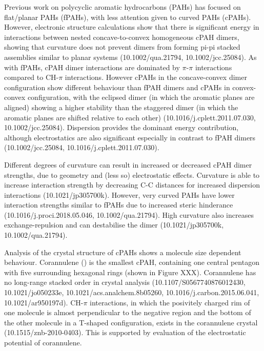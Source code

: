 Previous work on polycyclic aromatic hydrocarbons (PAHs) has focused on flat/planar PAHs (fPAHs), with less attention given to curved PAHs (cPAHs). However, electronic structure calculations show that there is significant energy in interactions between nested concave-to-convex homogeneous cPAH dimers, showing that curvature does not prevent dimers from forming pi-pi stacked assemblies similar to planar systems (10.1002/qua.21794, 10.1002/jcc.25084). As with fPAHs, cPAH dimer interactions are dominated by $\pi$-$\pi$ interactions compared to CH-$\pi$ interactions. However cPAHs in the concave-convex dimer configuration show different behaviour than fPAH dimers and cPAHs in convex-convex configuration, with the eclipsed dimer (in which the aromatic planes are aligned) showing a higher stability than the staggered dimer (in which the aromatic planes are shifted relative to each other) (10.1016/j.cplett.2011.07.030, 10.1002/jcc.25084).
Dispersion provides the dominant energy contribution, although electrostatics are also significant especially in contrast to fPAH dimers (10.1002/jcc.25084, 10.1016/j.cplett.2011.07.030). 

Different degrees of curvature can result in increased or decreased cPAH dimer strengths, due to geometry and (less so) electrostatic effects. Curvature is able to increase interaction strength by decreasing C-C distances for increased dispersion interactions (10.1021/jp305700k). 
However, very curved PAHs have lower interaction strengths similar to fPAHs due to increased steric hinderance (10.1016/j.proci.2018.05.046, 10.1002/qua.21794). High curvature also increases exchange-repulsion and can destabilise the dimer (10.1021/jp305700k, 10.1002/qua.21794).


Analysis of the crystal structure of cPAHs shows a molecule size dependent behaviour. Corannulene () is the smallest cPAH, containing one central pentagon with five surrounding hexagonal rings (shown in Figure XXX). Corannulene has no long-range stacked order in crystal analysis (10.1107/S0567740876012430, 10.1021/jo050233e, 10.1021/acs.analchem.8b05260, 10.1016/j.carbon.2015.06.041, 10.1021/ar950197d). 
CH-$\pi$ interactions, in which the posivitely charged rim of one molecule is almost perpendicular to the negative region and the bottom of the other molecule in a T-shaped configuration, exists in the corannulene crystal (10.1515/znb-2010-0403). This is supported by evaluation of the electrostatic potential of corannulene.

